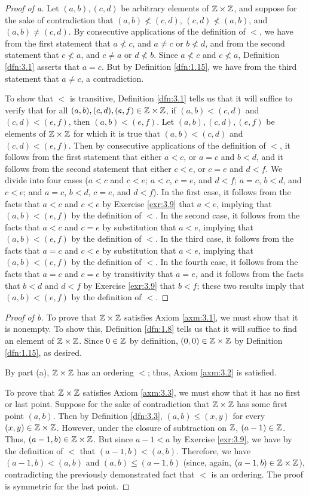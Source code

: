 \documentclass[../main.tex]{subfiles}
\begin{document}
\begin{enumerate}
\begin{proof}[Proof of a]
        Let $(a,b),(c,d)$ be arbitrary elements of $\mathbb{Z}\times\mathbb{Z}$, and suppose for the sake of contradiction that $(a,b)\not<(c,d)$, $(c,d)\not<(a,b)$, and $(a,b)\neq(c,d)$. By consecutive applications of the definition of $<$, we have from the first statement that $a\not<c$, and $a\neq c$ or $b\not<d$, and from the second statement that $c\not<a$, and $c\neq a$ or $d\not<b$. Since $a\not<c$ and $c\not<a$, Definition \ref{dfn:3.1} asserts that $a=c$. But by Definition \ref{dfn:1.15}, we have from the third statement that $a\neq c$, a contradiction.\par\smallskip
        To show that $<$ is transitive, Definition \ref{dfn:3.1} tells us that it will suffice to verify that for all $(a,b),(c,d),(e,f)\in\mathbb{Z}\times\mathbb{Z}$, if $(a,b)<(c,d)$ and $(c,d)<(e,f)$, then $(a,b)<(e,f)$. Let $(a,b),(c,d),(e,f)$ be elements of $\mathbb{Z}\times\mathbb{Z}$ for which it is true that $(a,b)<(c,d)$ and $(c,d)<(e,f)$. Then by consecutive applications of the definition of $<$, it follows from the first statement that either $a<c$, or $a=c$ and $b<d$, and it follows from the second statement that either $c<e$, or $c=e$ and $d<f$. We divide into four cases ($a<c$ and $c<e$; $a<c$, $c=e$, and $d<f$; $a=c$, $b<d$, and $c<e$; and $a=c$, $b<d$, $c=e$, and $d<f$). In the first case, it follows from the facts that $a<c$ and $c<e$ by Exercise \ref{exr:3.9} that $a<e$, implying that $(a,b)<(e,f)$ by the definition of $<$. In the second case, it follows from the facts that $a<c$ and $c=e$ by substitution that $a<e$, implying that $(a,b)<(e,f)$ by the definition of $<$. In the third case, it follows from the facts that $a=c$ and $c<e$ by substitution that $a<e$, implying that $(a,b)<(e,f)$ by the definition of $<$. In the fourth case, it follows from the facts that $a=c$ and $c=e$ by transitivity that $a=e$, and it follows from the facts that $b<d$ and $d<f$ by Exercise \ref{exr:3.9} that $b<f$; these two results imply that $(a,b)<(e,f)$ by the definition of $<$.
    \end{proof}
    \begin{proof}[Proof of b]
        To prove that $\mathbb{Z}\times\mathbb{Z}$ satisfies Axiom \ref{axm:3.1}, we must show that it is nonempty. To show this, Definition \ref{dfn:1.8} tells us that it will suffice to find an element of $\mathbb{Z}\times\mathbb{Z}$. Since $0\in\mathbb{Z}$ by definition, $(0,0)\in\mathbb{Z}\times\mathbb{Z}$ by Definition \ref{dfn:1.15}, as desired.\par
        By part (a), $\mathbb{Z}\times\mathbb{Z}$ has an ordering $<$; thus, Axiom \ref{axm:3.2} is satisfied.\par
        To prove that $\mathbb{Z}\times\mathbb{Z}$ satisfies Axiom \ref{axm:3.3}, we must show that it has no first or last point. Suppose for the sake of contradiction that $\mathbb{Z}\times\mathbb{Z}$ has some first point $(a,b)$. Then by Definition \ref{dfn:3.3}, $(a,b)\leq(x,y)$ for every $(x,y)\in\mathbb{Z}\times\mathbb{Z}$. However, under the closure of subtraction on $\mathbb{Z}$, $(a-1)\in\mathbb{Z}$. Thus, $(a-1,b)\in\mathbb{Z}\times\mathbb{Z}$. But since $a-1<a$ by Exercise \ref{exr:3.9}, we have by the definition of $<$ that $(a-1,b)<(a,b)$. Therefore, we have $(a-1,b)<(a,b)$ and $(a,b)\leq(a-1,b)$ (since, again, $(a-1,b)\in\mathbb{Z}\times\mathbb{Z}$), contradicting the previously demonstrated fact that $<$ is an ordering. The proof is symmetric for the last point.

\end{proof}
\end{enumerate}
\end{document}
